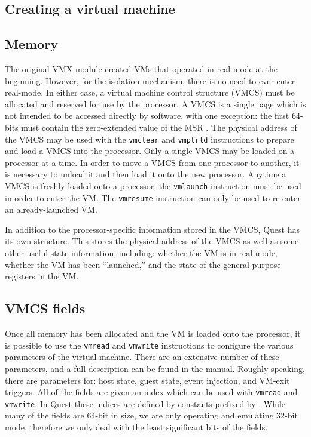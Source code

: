 \documentclass[twocolumn]{article}
\newcommand\type[1]{{\path {#1}}}
\newcommand\defn[1]{{\path {#1}}}
\newcommand\MSR[1]{{\path {#1}}}
\newcommand\inst[1]{{\tt {#1}}}
\begin{document}
\subsection{Creating a virtual machine}
\subsection{Memory}
The original VMX module created VMs that operated in real-mode at the
beginning.  However, for the isolation mechanism, there is no need to
ever enter real-mode.  In either case, a virtual machine control
structure (VMCS) must be allocated and reserved for use by the
processor.  A VMCS is a single page which is not intended to be
accessed directly by software, with one exception: the first 64-bits
must contain the zero-extended value of the MSR \MSR{IA32_VMX_BASIC}.
The physical address of the VMCS may be used with the \inst{vmclear}
and \inst{vmptrld} instructions to prepare and load a VMCS into the
processor.  Only a single VMCS may be loaded on a processor at a time.
In order to move a VMCS from one processor to another, it is necessary
to unload it and then load it onto the new processor.  Anytime a VMCS
is freshly loaded onto a processor, the \inst{vmlaunch} instruction
must be used in order to enter the VM.  The \inst{vmresume}
instruction can only be used to re-enter an already-launched VM.

In addition to the processor-specific information stored in the VMCS,
Quest has its own \type{virtual_machine} structure.  This stores the
physical address of the VMCS as well as some other useful state
information, including: whether the VM is in real-mode, whether the VM
has been ``launched,'' and the state of the general-purpose registers
in the VM.

\subsection{VMCS fields}
Once all memory has been allocated and the VM is loaded onto the
processor, it is possible to use the \inst{vmread} and \inst{vmwrite}
instructions to configure the various parameters of the virtual
machine.  There are an extensive number of these parameters, and a
full description can be found in the manual.  Roughly speaking, there
are parameters for: host state, guest state, event injection, and
VM-exit triggers.  All of the fields are given an index which can be
used with \inst{vmread} and \inst{vmwrite}.  In Quest these indices
are defined by constants prefixed by \defn{VMXENC_}.  While many of
the fields are 64-bit in size, we are only operating and emulating
32-bit mode, therefore we only deal with the least significant bits of
the fields.
\end{document}
